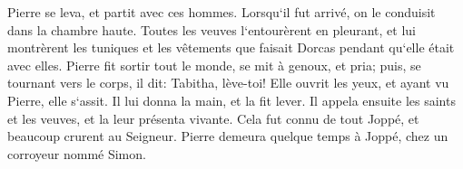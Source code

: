 \verse Pierre se leva, et partit avec ces hommes. Lorsqu`il fut arrivé, on le conduisit dans la chambre haute. Toutes les veuves l`entourèrent en pleurant, et lui montrèrent les tuniques et les vêtements que faisait Dorcas pendant qu`elle était avec elles. 
\verse Pierre fit sortir tout le monde, se mit à genoux, et pria; puis, se tournant vers le corps, il dit: Tabitha, lève-toi! Elle ouvrit les yeux, et ayant vu Pierre, elle s`assit. 
\verse Il lui donna la main, et la fit lever. Il appela ensuite les saints et les veuves, et la leur présenta vivante. 
\verse Cela fut connu de tout Joppé, et beaucoup crurent au Seigneur. 
\verse Pierre demeura quelque temps à Joppé, chez un corroyeur nommé Simon. 

\chapter{}

